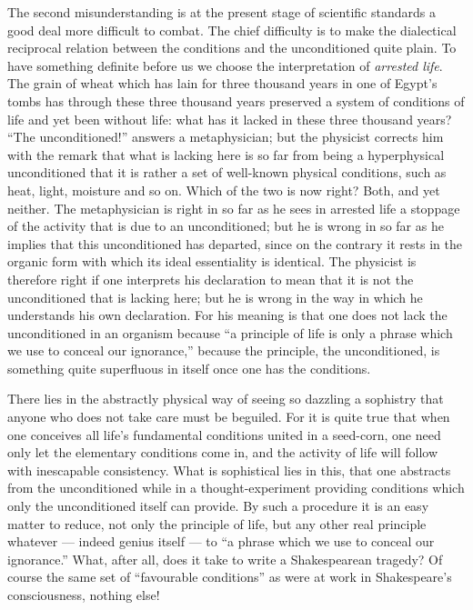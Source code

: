 \documentclass[12pt,a4paper]{book}
\begin{document}
The second misunderstanding is at the present stage of scientific standards a
good deal more difficult to combat. The chief difficulty is to make the
dialectical reciprocal relation between the conditions and the unconditioned
quite plain. To have something definite before us we choose the interpretation
of \emph{arrested life}. The grain of wheat which has lain for three thousand
years in one of Egypt's tombs has through these three thousand years preserved
a system of conditions of life and yet been without life: what has it lacked in
these three thousand years? ``The unconditioned!'' answers a metaphysician; but
the physicist corrects him with the remark that what is lacking here is so far
from being a hyperphysical unconditioned
that it is rather a set of well-known physical conditions, such as heat, light,
moisture and so on. Which of the two is now right? Both, and yet neither. The
metaphysician is right in so far as he sees in arrested life a stoppage of the
activity that is due to an unconditioned; but he is wrong in so far as he
implies that this unconditioned has departed, since on the contrary it rests in
the organic form with which its ideal essentiality is identical. The physicist
is therefore right if one interprets his declaration to mean that it is not the
unconditioned that is lacking here; but he is wrong in the way in which he
understands his own declaration. For his meaning is that one does not lack the
unconditioned in an organism because ``a principle of life is only a phrase
which we use to conceal our ignorance,'' because the principle, the
unconditioned, is something quite superfluous in itself once one has the
conditions.

There lies in the abstractly physical way of seeing so dazzling a sophistry
that anyone who does not take care must be beguiled. For it is quite true that
when one conceives all life's fundamental conditions united in a seed-corn, one
need only let the elementary conditions come in, and the activity of life will
follow with inescapable consistency. What is sophistical lies in this, that one
abstracts from the unconditioned while in a thought-experiment providing
conditions which only the unconditioned itself can provide. By such a procedure
it is an easy matter to reduce, not only the principle of life, but any other
real principle whatever --- indeed genius itself --- to ``a phrase which we use
to conceal our ignorance.'' What, after all, does it take to write a
Shakespearean tragedy? Of course the same set of ``favourable conditions'' as
were at work in Shakespeare's consciousness, nothing else!
\end{document}
